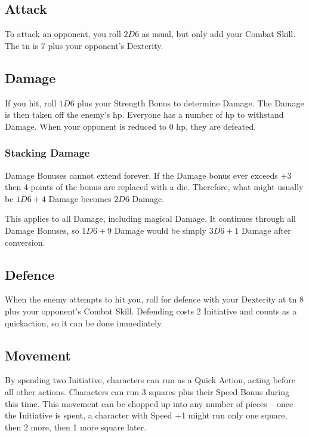 \documentclass[titlepage,a4paper,openany]{book}
\begin{document}
\begin{multicols}{2}
\subsection{Attack}

To attack an opponent, you roll $2D6$ as usual, but only add your Combat Skill.
The \gls{tn} is 7 plus your opponent's Dexterity.

\subsection{Damage}

If you hit, roll $1D6$ plus your Strength Bonus to determine Damage.
The Damage is then taken off the enemy's \gls{hp}.
Everyone has a number of \gls{hp} to withstand Damage. When your opponent is reduced to 0 \gls{hp}, they are defeated.

\subsubsection{Stacking Damage}

Damage Bonuses cannot extend forever. If the Damage bonus ever exceeds +3 then 4 points of the bonus are replaced with a die. Therefore, what might usually be $1D6+4$ Damage becomes $2D6$ Damage.

This applies to all Damage, including magical Damage. It continues through all Damage Bonuses, so $1D6+9$ Damage would be simply $3D6+1$ Damage after conversion.

\subsection{Defence}

When the enemy attempts to hit you, roll for defence with your Dexterity at \gls{tn} 8 plus your opponent's Combat Skill.
Defending costs 2 Initiative and counts as a \gls{quickaction}, so it can be done immediately.

\subsection{Movement}

By spending two Initiative, characters can run as a Quick Action, acting before all other actions. Characters can run 3 squares plus their Speed Bonus during this time. This movement can be chopped up into any number of pieces -- once the Initiative is spent, a character with Speed +1 might run only one square, then 2 more, then 1 more square later.


\end{multicols}
\end{document}
